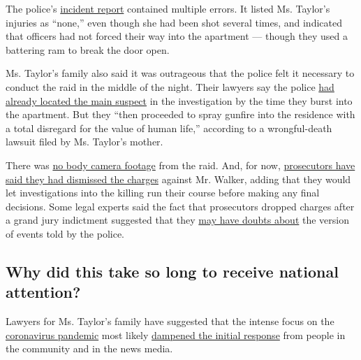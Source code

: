 The police's
\href{https://www.scribd.com/document/465105285/Breonna-Taylor-Incident-Report\#from_embed?campaign=SkimbitLtd\&ad_group=1025X1162200X37e14a5d9156059be0d5da4023a17e62\&keyword=660149026\&source=hp_affiliate\&medium=affiliate}{incident
report} contained multiple errors. It listed Ms. Taylor's injuries as
``none,'' even though she had been shot several times, and indicated
that officers had not forced their way into the apartment --- though
they used a battering ram to break the door open.

Ms. Taylor's family also said it was outrageous that the police felt it
necessary to conduct the raid in the middle of the night. Their lawyers
say the police
\href{https://www.nytimes3xbfgragh.onion/2020/05/14/us/breonna-taylor-louisville-shooting.html}{had
already located the main suspect} in the investigation by the time they
burst into the apartment. But they ``then proceeded to spray gunfire
into the residence with a total disregard for the value of human life,''
according to a wrongful-death lawsuit filed by Ms. Taylor's mother.

There was
\href{https://www.facebookcorewwwi.onion/LMPD.ky/videos/206839417221050/}{no
body camera footage} from the raid. And, for now,
\href{https://www.nytimes3xbfgragh.onion/2020/05/22/us/Breonna-Taylor-Kenneth-Walker.html}{prosecutors
have said they had dismissed the charges} against Mr. Walker, adding
that they would let investigations into the killing run their course
before making any final decisions. Some legal experts said the fact that
prosecutors dropped charges after a grand jury indictment suggested that
they
\href{https://www.nytimes3xbfgragh.onion/2020/05/22/us/Breonna-Taylor-Kenneth-Walker.html}{may
have doubts about} the version of events told by the police.

\hypertarget{why-did-this-take-so-long-to-receive-national-attention}{%
\subsection{Why did this take so long to receive national
attention?}\label{why-did-this-take-so-long-to-receive-national-attention}}

Lawyers for Ms. Taylor's family have suggested that the intense focus on
the
\href{https://www.nytimes3xbfgragh.onion/news-event/coronavirus}{coronavirus
pandemic} most likely
\href{https://www.courier-journal.com/story/news/crime/2020/05/12/mother-breonna-taylor-louisville-emt-shot-police-speaks-out/3116777001/}{dampened
the initial response} from people in the community and in the news
media.

